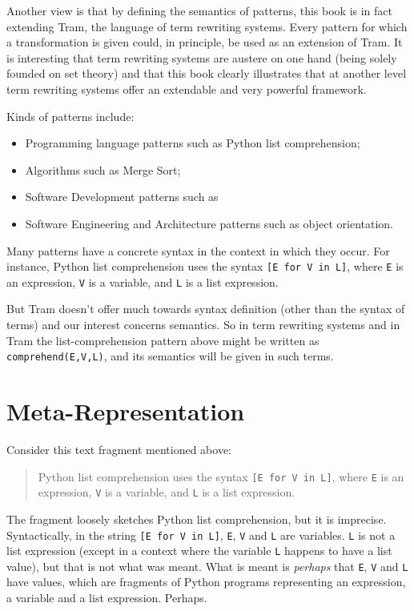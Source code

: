 \documentclass[11pt,twoside]{memoir}
\def\E{\emph} %
\def\T{\texttt}
\begin{document}
Another view is that by defining the semantics of patterns, this book is in fact extending Tram, the language of term rewriting systems. Every pattern for which a transformation is given could, in principle, be used as an extension of Tram. It is interesting that term rewriting systems are austere on one hand (being solely founded on set theory) and that this book clearly illustrates that at another level term rewriting systems offer an extendable and very powerful framework.


Kinds of patterns include:

\begin{itemize}
	\item Programming language patterns such as Python list comprehension;
	\item Algorithms such as Merge Sort;
	\item Software Development patterns such as 
	\item Software Engineering and Architecture patterns such as object orientation.
\end{itemize}

Many patterns have a concrete syntax in the context in which they occur. For instance, Python list comprehension uses the syntax \T{[E for V in L]}, where \T{E} is an expression, \T{V} is a variable, and \T{L} is a list expression. 

But Tram doesn't offer much towards syntax definition (other than the syntax of terms) and our interest concerns semantics. So in term rewriting systems and in Tram the list-comprehension pattern above might be written as \T{comprehend(E,V,L)}, and its semantics will be given in such terms.

\chapter{Meta-Representation}

Consider this text fragment mentioned above:

\begin{quote}
	Python list comprehension uses the syntax \T{[E for V in L]}, where \T{E} is an expression, \T{V} is a variable, and \T{L} is a list expression.
\end{quote}

The fragment loosely sketches Python list comprehension, but it is imprecise. Syntactically, in the string \T{[E for V in L]}, \T{E}, \T{V} and \T{L} are  variables. \T{L} is not a list expression (except in a context where the variable \T{L} happens to have a list value), but that is not what was meant. What is meant is \E{perhaps} that \T{E}, \T{V} and \T{L} have values, which are fragments of Python programs representing an expression, a variable and a list expression. Perhaps.
\end{document}
